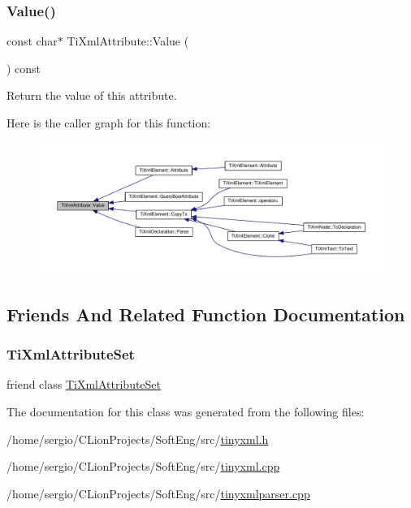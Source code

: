 \subsubsection{\texorpdfstring{Value()}{Value()}}
{\footnotesize\ttfamily const char$\ast$ Ti\+Xml\+Attribute\+::\+Value (\begin{DoxyParamCaption}{ }\end{DoxyParamCaption}) const\hspace{0.3cm}{\ttfamily [inline]}}



Return the value of this attribute. 

Here is the caller graph for this function\+:\nopagebreak
\begin{figure}[H]
\begin{center}
\leavevmode
\includegraphics[width=350pt]{class_ti_xml_attribute_ac9f0b56fcacbedb6eb49e5f282bef014_icgraph}
\end{center}
\end{figure}


\subsection{Friends And Related Function Documentation}
\mbox{\label{class_ti_xml_attribute_a35a7b7f89f708527677d5078d41ce0bf}} 
\subsubsection{\texorpdfstring{Ti\+Xml\+Attribute\+Set}{TiXmlAttributeSet}}
{\footnotesize\ttfamily friend class \hyperlink{class_ti_xml_attribute_set}{Ti\+Xml\+Attribute\+Set}\hspace{0.3cm}{\ttfamily [friend]}}



The documentation for this class was generated from the following files\+:\begin{DoxyCompactItemize}
\item 
/home/sergio/\+C\+Lion\+Projects/\+Soft\+Eng/src/\hyperlink{tinyxml_8h}{tinyxml.\+h}\item 
/home/sergio/\+C\+Lion\+Projects/\+Soft\+Eng/src/\hyperlink{tinyxml_8cpp}{tinyxml.\+cpp}\item 
/home/sergio/\+C\+Lion\+Projects/\+Soft\+Eng/src/\hyperlink{tinyxmlparser_8cpp}{tinyxmlparser.\+cpp}\end{DoxyCompactItemize}

